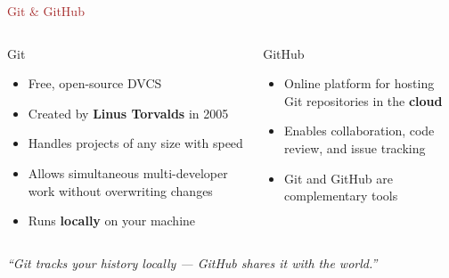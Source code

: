 \begin{frame}{\textcolor{brown}{Git \& GitHub}}
  \begin{columns}[T]
      \begin{block}{\faGit*\; Git}
        \begin{itemize}
          \item Free, open-source DVCS
          \item Created by \textbf{Linus Torvalds} in 2005
          \item Handles projects of any size with speed
          \item Allows simultaneous multi-developer work without overwriting changes
          \item Runs \textbf{locally} on your machine
        \end{itemize}
      \end{block}

      \begin{block}{\faGithub\; GitHub}
        \begin{itemize}
          \item Online platform for hosting Git repositories in the \textbf{cloud}
          \item Enables collaboration, code review, and issue tracking
          \item Git and GitHub are complementary tools
        \end{itemize}
      \end{block}
  \end{columns}

  \vspace{0.8em}
  \centering
  \textit{``Git tracks your history locally — GitHub shares it with the world.''}
\end{frame}